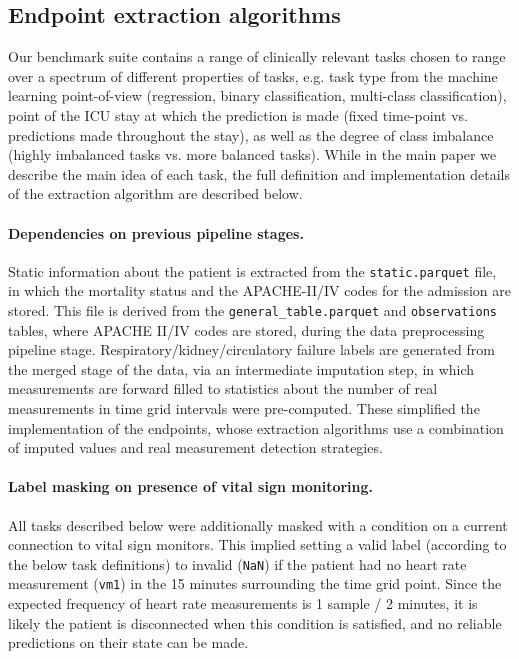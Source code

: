 \documentclass{article}
\begin{document}
\subsection*{Endpoint extraction algorithms}

Our benchmark suite contains a range of clinically relevant tasks chosen to range over a spectrum of different properties of tasks, e.g. task type from the machine learning point-of-view (regression, binary classification, multi-class classification), point of the ICU stay at which the prediction is made (fixed time-point vs. predictions made throughout the stay), as well as the degree of class imbalance (highly imbalanced tasks vs. more balanced tasks). While in the main paper we describe the main idea of each task, the full definition and implementation details of the extraction algorithm are described below.

\paragraph{Dependencies on previous pipeline stages.}Static information about the patient is extracted from the \texttt{static.parquet} file, in which the mortality status and the APACHE-II/IV codes for the admission are stored. This file is derived from the \texttt{general\_table.parquet} and \texttt{observations} tables, where APACHE II/IV codes are stored, during the data preprocessing pipeline stage. Respiratory/kidney/circulatory failure labels are generated from the merged stage of the data, via an intermediate imputation step, in which measurements are forward filled to statistics about the number of real measurements in time grid intervals were pre-computed. These simplified the implementation of the endpoints, whose extraction algorithms use a combination of imputed values and real measurement detection strategies.

\paragraph{Label masking on presence of vital sign monitoring. } All tasks described below were additionally masked with a condition on a current connection to vital sign monitors. This implied setting a valid label (according to the below task definitions) to invalid (\texttt{NaN}) if the patient had no heart rate measurement (\texttt{vm1}) in the 15 minutes surrounding the time grid point. Since the expected frequency of heart rate measurements is 1 sample / 2 minutes, it is likely the patient is disconnected when this condition is satisfied, and no reliable predictions on their state can be made.
\end{document}
